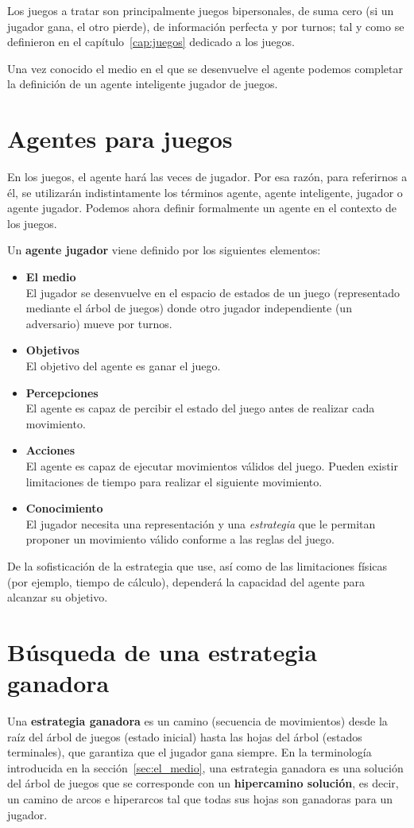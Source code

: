Los juegos a tratar son principalmente juegos bipersonales, de suma cero (si un jugador gana, el otro pierde), de información perfecta y por turnos; tal y como se definieron en el capítulo~\ref{cap:juegos} dedicado a los juegos.

\bigskip
Una vez conocido el medio en el que se desenvuelve el agente podemos completar la definición de un agente inteligente jugador de juegos.

\section{Agentes para juegos}
\label{sec:agentes_para_juegos}
En los juegos, el agente hará las veces de jugador.
Por esa razón, para referirnos a él, se utilizarán indistintamente los términos agente, agente inteligente, jugador o agente jugador.
Podemos ahora definir formalmente un agente en el contexto de los juegos.

Un \textbf{agente jugador} viene definido por los siguientes elementos:
\begin{itemize}	
	\item \textbf{El medio} \\
	El jugador se desenvuelve en el espacio de estados de un juego (representado mediante el árbol de juegos) donde otro jugador independiente (un adversario) mueve por turnos. 
	\item \textbf{Objetivos} \\
	El objetivo del agente es ganar el juego.
	\item \textbf{Percepciones} \\
	El agente es capaz de percibir el estado del juego antes de realizar cada movimiento.
	\item \textbf{Acciones} \\
	El agente es capaz de ejecutar movimientos válidos del juego.
	Pueden existir limitaciones de tiempo para realizar el siguiente movimiento.
	\item \textbf{Conocimiento} \\
	El jugador necesita una representación y una \textit{estrategia} que le permitan proponer un movimiento válido conforme a las reglas del juego.
\end{itemize}

De la sofisticación de la estrategia que use, así como de las limitaciones físicas (por ejemplo, tiempo de cálculo), dependerá la capacidad del agente para alcanzar su objetivo.

\section{Búsqueda de una estrategia ganadora}
\label{sec:busqueda_de_una_estrategia_ganadora}
Una \textbf{estrategia ganadora} es un camino (secuencia de movimientos) desde la raíz del árbol de juegos (estado inicial) hasta las hojas del árbol (estados terminales), que garantiza que el jugador gana siempre.
En la terminología introducida en la sección~\ref{sec:el_medio}, una estrategia ganadora es una solución del árbol de juegos que se corresponde con un \textbf{hipercamino solución}, es decir, un camino de arcos e hiperarcos tal que todas sus hojas son ganadoras para un jugador.

